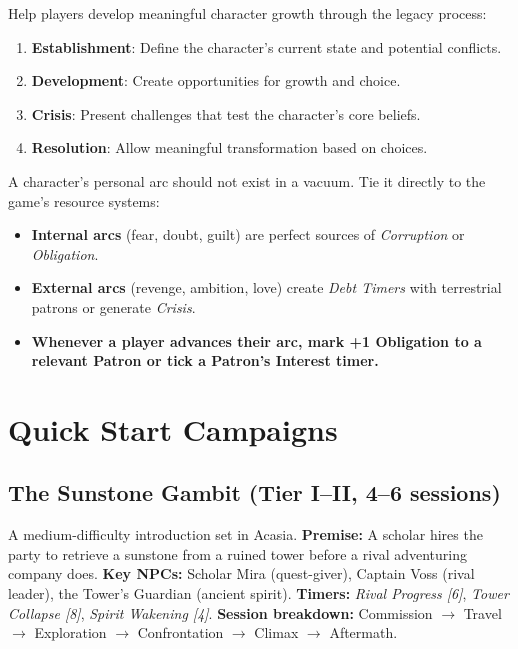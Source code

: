 Help players develop meaningful character growth through the legacy process:
\begin{enumerate}
  \item \textbf{Establishment}: Define the character's current state and potential conflicts.
  \item \textbf{Development}: Create opportunities for growth and choice.
  \item \textbf{Crisis}: Present challenges that test the character's core beliefs.
  \item \textbf{Resolution}: Allow meaningful transformation based on choices.
\end{enumerate}

\begin{tcolorbox}[colback=green!5!white, colframe=green!75!black, title={Arcs Generate Obligation and Patron Interest},breakable]
  A character's personal arc should not exist in a vacuum. Tie it directly to the game's resource systems:
  \begin{itemize}
    \item \textbf{Internal arcs} (fear, doubt, guilt) are perfect sources of \textit{Corruption} or \textit{Obligation}.
    \item \textbf{External arcs} (revenge, ambition, love) create \textit{Debt Timers} with terrestrial patrons or generate \textit{Crisis}.
    \item \textbf{Whenever a player advances their arc, mark +1 Obligation to a relevant Patron or tick a Patron's Interest timer.}
  \end{itemize}
\end{tcolorbox}

\section{Quick Start Campaigns}
\label{sec:quick-start-campaigns}

\subsection{The Sunstone Gambit (Tier I--II, 4--6 sessions)}
A medium-difficulty introduction set in Acasia.  
\textbf{Premise:} A scholar hires the party to retrieve a sunstone from a ruined tower before a rival adventuring company does.  
\textbf{Key NPCs:} Scholar Mira (quest-giver), Captain Voss (rival leader), the Tower's Guardian (ancient spirit).  
\textbf{Timers:} \emph{Rival Progress [6]}, \emph{Tower Collapse [8]}, \emph{Spirit Wakening [4]}.  
\textbf{Session breakdown:} Commission $\rightarrow$ Travel $\rightarrow$ Exploration $\rightarrow$ Confrontation $\rightarrow$ Climax $\rightarrow$ Aftermath.

